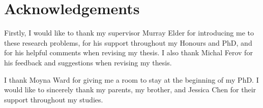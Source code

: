 \chapter{Acknowledgements}

Firstly, I would like to thank my supervisor Murray Elder for introducing me to these research problems, for his support throughout my Honours and PhD, and for his helpful comments when revising my thesis.
I also thank Michal Ferov for his feedback and suggestions when revising my thesis.

I thank Moyna Ward for giving me a room to stay at the beginning of my PhD.
I would like to sincerely thank my parents, my brother, and Jessica Chen for their support throughout my studies.